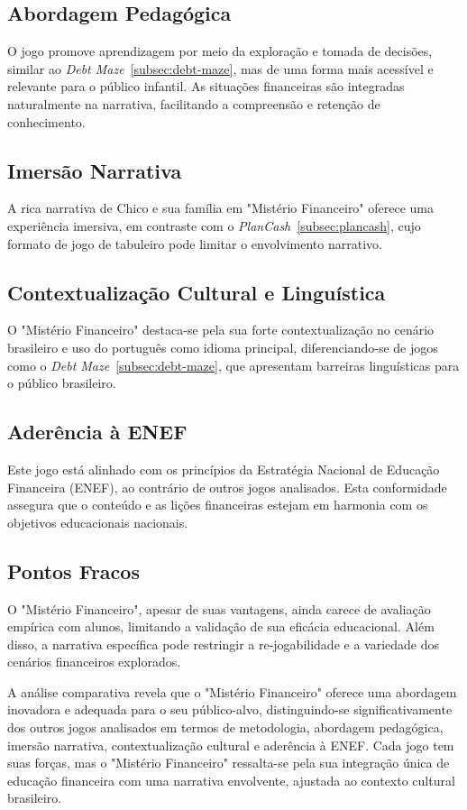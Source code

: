 \subsection*{Abordagem Pedagógica}
O jogo promove aprendizagem por meio da exploração e tomada de decisões, similar ao \textit{Debt Maze}~\ref{subsec:debt-maze}, mas de uma forma mais acessível e relevante para o público infantil. As situações financeiras são integradas naturalmente na narrativa, facilitando a compreensão e retenção de conhecimento.

\subsection*{Imersão Narrativa}
A rica narrativa de Chico e sua família em "Mistério Financeiro" oferece uma experiência imersiva, em contraste com o \textit{PlanCash}~\ref{subsec:plancash}, cujo formato de jogo de tabuleiro pode limitar o envolvimento narrativo.

\subsection*{Contextualização Cultural e Linguística}
O "Mistério Financeiro" destaca-se pela sua forte contextualização no cenário brasileiro e uso do português como idioma principal, diferenciando-se de jogos como o \textit{Debt Maze}~\ref{subsec:debt-maze}, que apresentam barreiras linguísticas para o público brasileiro.

\subsection*{Aderência à ENEF}
Este jogo está alinhado com os princípios da Estratégia Nacional de Educação Financeira (ENEF), ao contrário de outros jogos analisados. Esta conformidade assegura que o conteúdo e as lições financeiras estejam em harmonia com os objetivos educacionais nacionais.

\subsection*{Pontos Fracos}
O "Mistério Financeiro", apesar de suas vantagens, ainda carece de avaliação empírica com alunos, limitando a validação de sua eficácia educacional. Além disso, a narrativa específica pode restringir a re-jogabilidade e a variedade dos cenários financeiros explorados.

A análise comparativa revela que o "Mistério Financeiro" oferece uma abordagem inovadora e adequada para o seu público-alvo, distinguindo-se significativamente dos outros jogos analisados em termos de metodologia, abordagem pedagógica, imersão narrativa, contextualização cultural e aderência à ENEF. Cada jogo tem suas forças, mas o "Mistério Financeiro" ressalta-se pela sua integração única de educação financeira com uma narrativa envolvente, ajustada ao contexto cultural brasileiro.
